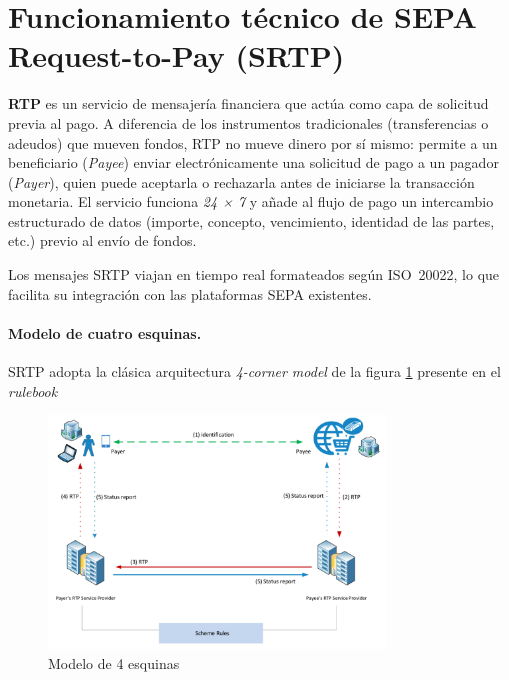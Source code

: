 \section{Funcionamiento técnico de SEPA Request-to-Pay (SRTP)}
\label{subsec:funcionamiento-srtp}

\textbf{RTP} es un servicio de mensajería financiera que actúa como capa de solicitud previa al pago. A diferencia de los instrumentos tradicionales (transferencias o adeudos) que mueven fondos, RTP no mueve dinero por sí mismo: permite a un beneficiario (\emph{Payee}) enviar electrónicamente una solicitud de pago a un pagador (\emph{Payer}), quien puede aceptarla o rechazarla antes de iniciarse la transacción monetaria. El servicio funciona \emph{24 × 7} y añade al flujo de pago un intercambio estructurado de datos (importe, concepto, vencimiento, identidad de las partes, etc.) previo al envío de fondos.  

Los mensajes SRTP viajan en tiempo real formateados según ISO~20022, lo que facilita su integración con las plataformas SEPA existentes.

\paragraph{Modelo de cuatro esquinas.} SRTP adopta la clásica arquitectura \emph{4-corner model} \cite{fourcorner_wiki} de la figura \ref{fig:4corner} presente en el \textit{rulebook} \cite{ecp014}

\begin{figure}[htbp]
  \centering
  \includegraphics[width=0.8\textwidth]{Imagenes/4CornerModel.pdf}
  \caption{Modelo de 4 esquinas}
  \label{fig:4corner}
\end{figure}



